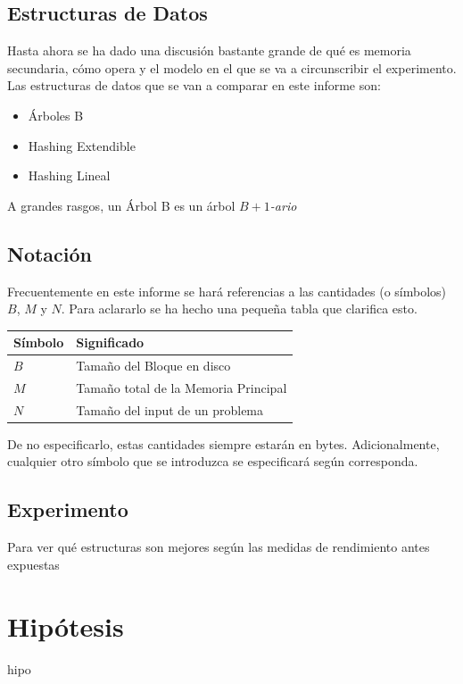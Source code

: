 \documentclass[12pt,letterpaper]{report}
\begin{document}
\subsection{Estructuras de Datos}
Hasta ahora se ha dado una discusión bastante grande de qué es memoria secundaria, cómo opera y el modelo en el que se va a circunscribir el experimento. Las estructuras de datos que se van a comparar en este informe son:

\begin{itemize}
\item Árboles B
\item Hashing Extendible
\item Hashing Lineal
\end{itemize}

A grandes rasgos, un Árbol B es un árbol $B+1$\emph{-ario}

\subsection{Notación}

Frecuentemente en este informe se hará referencias a las cantidades (o símbolos) $B$, $M$ y $N$. Para aclararlo se ha hecho una pequeña tabla que clarifica esto.

\begin{center}
\begin{tabular}{l|l}
Símbolo & Significado \\ \hline
$B$ & Tamaño del Bloque en disco \\
$M$ & Tamaño total de la Memoria Principal \\
$N$ & Tamaño del input de un problema
\end{tabular}
\end{center}

De no especificarlo, estas cantidades siempre estarán en bytes. Adicionalmente, cualquier otro símbolo que se introduzca se especificará según corresponda.

\subsection{Experimento}

Para ver qué estructuras son mejores según las medidas de rendimiento antes expuestas 


\newpage
\section{Hipótesis}
hipo
\end{document}
